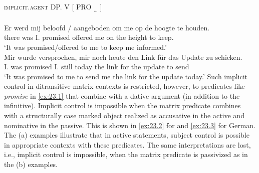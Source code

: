 \documentclass[output=paper]{langsci/langscibook}
\begin{document}
\ea\label{ex:23.1}
    \textsc{implicit.agent}  DP.\Dat{}  V  [\textsubscript{\Inf{}}  PRO\textsubscript{ …}  ]\\
    \ea\label{ex:23.1a}  \parencite[171, (8)]{vanUrk2013}\\
		\gll Er  werd  mij  beloofd / aangeboden  om  me  op de hoogte  te houden.\\
                there  was  I.\Dat{}  promised {} offered  \Comp{}  me  on the height  to keep.\textsc{\Inf{}}\\
		\glt ‘It was promised/offered to me to keep me informed.’
    \ex\label{ex:23.1b}  \parencite[171, (9a)]{vanUrk2013}\\
		\gll Mir  wurde  versprochen,  mir  noch heute  den Link für das Update  zu schicken.\\
			I.\Dat{}  was  promised  I.\Dat{}  still today  the link for the update  to send\\
		\glt ‘It was promised to me to send me the link for the update today.’
	\z
\z
%
Such implicit control in ditransitive matrix contexts is restricted, however,
to predicates like \emph{promise} in \eqref{ex:23.1} that combine with a dative argument
(in addition to the infinitive). Implicit control is impossible when the matrix
predicate combines with a structurally case marked object realized as
accusative in the active and nominative in the passive.
This is shown in \eqref{ex:23.2} for  and \eqref{ex:23.3} for German. The (a) examples
illustrate that in active statements, subject control is possible in
appropriate contexts with these predicates. The same interpretations are lost,
i.e., implicit control is impossible, when the matrix predicate is passivized
as in the (b) examples.\largerpage[2]
\end{document}

